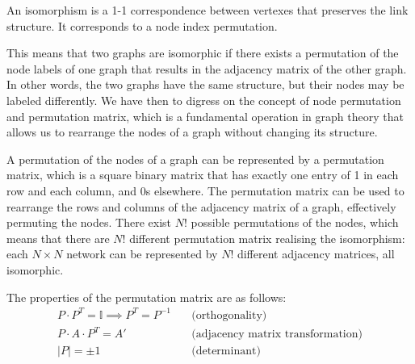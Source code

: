 \begin{definition}
    An isomorphism is a 1-1 correspondence between vertexes that preserves the link structure. It corresponds to a node index permutation.
\end{definition}

This means that two graphs are isomorphic if there exists a permutation of the node labels of one graph that results in the adjacency matrix of the other graph. In other words, the two graphs have the same structure, but their nodes may be labeled differently. We have then to digress on the concept of node permutation and permutation matrix, which is a fundamental operation in graph theory that allows us to rearrange the nodes of a graph without changing its structure.

A permutation of the nodes of a graph can be represented by a permutation matrix, which is a square binary matrix that has exactly one entry of 1 in each row and each column, and 0s elsewhere. The permutation matrix can be used to rearrange the rows and columns of the adjacency matrix of a graph, effectively permuting the nodes. There exist \(N!\) possible permutations of the nodes, which means that there are \(N!\) different permutation matrix realising the isomorphism: each \(N\times N\) network can be represented by \(N!\) different adjacency matrices, all isomorphic.

The properties of the permutation matrix are as follows:
\[
    \begin{aligned}
        P \cdot P^T = \mathbb{I} \implies P^T = P^{-1} \quad & \text{(orthogonality)}                   \\
        P \cdot A \cdot P^T = A' \quad                       & \text{(adjacency matrix transformation)} \\
        \vert P \vert = \pm 1 \quad                          & \text{(determinant)}                     \\
    \end{aligned}
\]


